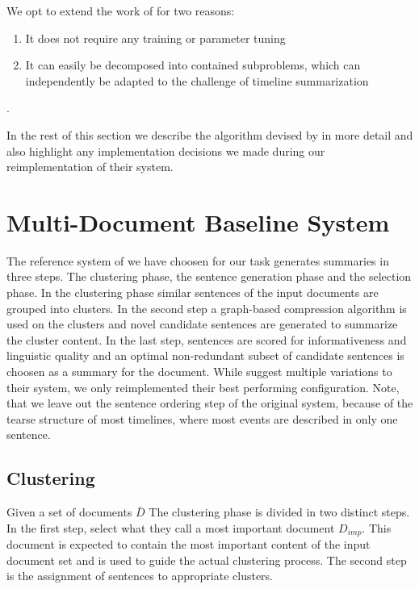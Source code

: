 \documentclass[a4paper,BCOR=10mm]{report}
\numberwithin{lemma}{chapter}
\numberwithin{definition}{chapter}
\begin{document}
We opt to extend the work of \citep{banerjee} for two reasons:

\begin{enumerate}
\item{It does not require any training or parameter tuning}
\item{It can easily be decomposed into contained subproblems, which can independently be adapted to the challenge of timeline summarization}
\end{enumerate}.

In the rest of this section we describe the algorithm devised by \citet{banerjee} in more detail and also highlight any implementation decisions we made during our reimplementation of their system.

\section{Multi-Document Baseline System} \label{sec:mds-baseline}

The reference system of \citet{banerjee} we have choosen for our task generates summaries in three steps. The clustering phase, the sentence generation phase and the selection phase. In the clustering phase similar sentences of the input documents are grouped into clusters. In the second step a graph-based compression algorithm is used on the clusters and novel candidate sentences are generated to summarize the cluster content. In the last step, sentences are scored for informativeness and linguistic quality and an optimal non-redundant subset of candidate sentences is choosen as a summary for the document.
While \citeauthor{banerjee} suggest multiple variations to their system, we only reimplemented their best performing configuration. Note, that we leave out the sentence ordering step of the original system, because of the tearse structure of most timelines, where most events are described in only one sentence.

\subsection{Clustering}  \label{sec:baseline-clustering}

Given a set of documents $\bar{D}$ The clustering phase is divided in two distinct steps. In the first step, \citeauthor{banerjee} select what they call a most important document $D_{imp}$. This document is expected to contain the most important content of the input document set and is used to guide the actual clustering process. The second step is the assignment of sentences to appropriate clusters.
\end{document}
